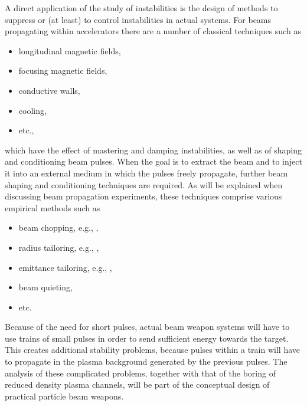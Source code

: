 \documentclass [12pt,a4paper,     ]{report} %
\begin{document}
        A direct application of the study of instabilities is the design of methods to suppress or (at least) to control instabilities in actual systems.  For beams propagating within accelerators there are a number of classical techniques such as
%
\begin{itemize}

\item longitudinal magnetic fields,

\item focusing magnetic fields,

\item conductive walls,

\item cooling,

\item etc.,

\end{itemize}
%
which have the effect of mastering and damping instabilities, as well as of shaping and conditioning beam pulses.  When the goal is to extract the beam and to inject it into an external medium in which the pulses freely propagate, further beam shaping and conditioning techniques are required.  As will be explained when discussing beam propagation experiments, these techniques comprise various empirical methods such as
%
\begin{itemize}

\item  beam chopping, e.g., \cite{BEAL-1972-,HESTE1974-},

\item  radius tailoring, e.g.,  \cite{FERNS1992-,WEIDM1994-},

\item  emittance tailoring, e.g., \cite{WEIDM1994-},

\item  beam quieting,

\item  etc.

\end{itemize}

	Because of the need for short pulses, actual beam weapon systems will have to use trains of small pulses in order to send sufficient energy towards the target.  This creates additional stability problems, because pulses within a train will have to propagate in the plasma background generated by the previous pulses.  The analysis of these complicated problems, together with that of the boring of reduced density plasma channels, will be part of the conceptual design of practical particle beam weapons.
\end{document}
